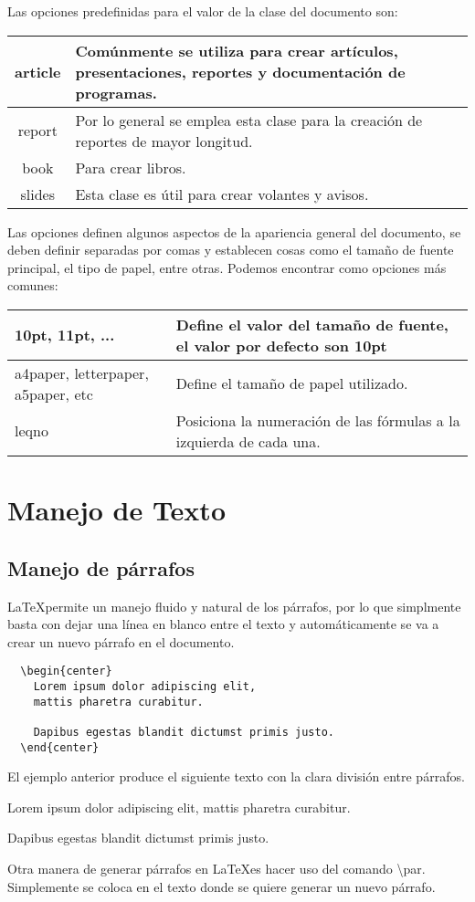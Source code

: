\documentclass[journal]{IEEEtran}
\begin{document}
Las opciones predefinidas para el valor de la clase del documento son:

\begin{tabular}[t]{|c|p{5cm}|}
  \hline
  article & Comúnmente se utiliza para crear artículos, presentaciones, reportes y documentación de programas. \\ \hline
  report & Por lo general se emplea esta clase para la creación de reportes de mayor longitud. \\ \hline
  book & Para crear libros. \\ \hline
  slides & Esta clase es útil para crear volantes y avisos. \\ \hline
\end{tabular}


Las opciones definen algunos aspectos de la apariencia general del documento, se deben
definir separadas por comas y establecen cosas como el tamaño de fuente principal, el tipo de papel, entre otras.
Podemos encontrar como opciones más comunes:
\begin{center}
  \begin{tabular}[t]{|m{2cm}|m{3cm}|}
    \hline
    10pt, 11pt, ... & Define el valor del tamaño de fuente, el valor por defecto son 10pt \\ \hline
    a4paper, letterpaper, a5paper, etc & Define el tamaño de papel utilizado. \\ \hline
    leqno & Posiciona la numeración de las fórmulas a la izquierda de cada una. \\ \hline
  \end{tabular}  
\end{center}




\section{Manejo de Texto}
\subsection{Manejo de párrafos}
\LaTeX permite un manejo fluido y natural de los párrafos, por lo que simplmente basta con dejar una línea en blanco entre el texto y automáticamente se va a crear un nuevo párrafo en el documento.
\begin{verbatim}
  \begin{center}
    Lorem ipsum dolor adipiscing elit, 
    mattis pharetra curabitur.
    
    Dapibus egestas blandit dictumst primis justo.
  \end{center}
\end{verbatim}
El ejemplo anterior produce el siguiente texto con la clara división entre párrafos.
\begin{center}
  Lorem ipsum dolor adipiscing elit, 
  mattis pharetra curabitur.
  
  Dapibus egestas blandit dictumst primis justo.
\end{center}
Otra manera de generar párrafos en \LaTeX es hacer uso del comando \textbackslash{}par.
Simplemente se coloca en el texto donde se quiere generar un nuevo párrafo.
\end{document}

